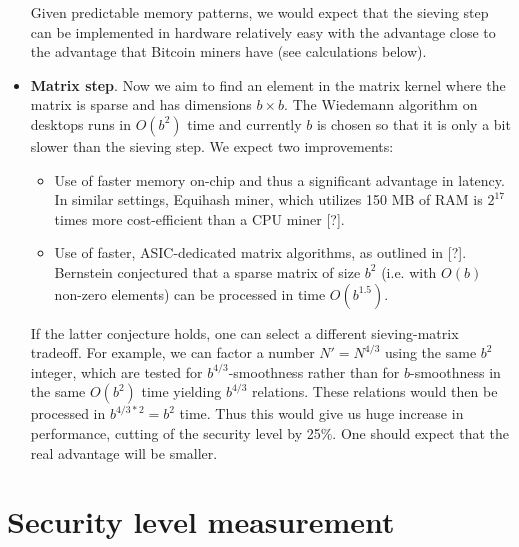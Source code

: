 \documentclass[a4paper]{article}
\begin{document}
\begin{itemize}
     Given predictable memory patterns, we would expect that the sieving step can be implemented in hardware relatively easy with the advantage close to the advantage that Bitcoin miners have (see calculations below).
     
     \item \textbf{Matrix step}. Now we aim to find an element in the matrix kernel where the matrix is sparse and has dimensions $b\times b$. The Wiedemann algorithm on desktops runs in $O(b^2)$ time and currently  $b$ is chosen so that it is only a bit slower than the sieving step. We expect two improvements: 
     \begin{itemize}
         \item Use of faster memory on-chip and thus a significant advantage in latency. In similar settings, Equihash miner, which utilizes 150 MB of RAM is $2^{17}$ times more cost-efficient than a CPU miner [?].
         \item Use of faster, ASIC-dedicated matrix algorithms, as outlined in [?]. Bernstein conjectured that a sparse matrix of size $b^2$ (i.e. with $O(b)$ non-zero elements) can be processed in time $O(b^{1.5})$.
     \end{itemize}
     If  the latter conjecture holds, one can select a different sieving-matrix tradeoff. For example, we can factor a number $N'=N^{4/3}$ using the same $b^2$ integer, which are  tested for $b^{4/3}$-smoothness rather than for $b$-smoothness in the same $O(b^2)$ time yielding $b^{4/3}$ relations. These relations would then be processed in $b^{4/3*2} = b^2$ time. Thus this would give us huge increase in performance, cutting of the security level by 25\%. One should expect that the real advantage will be smaller.
      
 \end{itemize}
 
\section{Security level measurement}\label{sec:measure}
\end{document}
